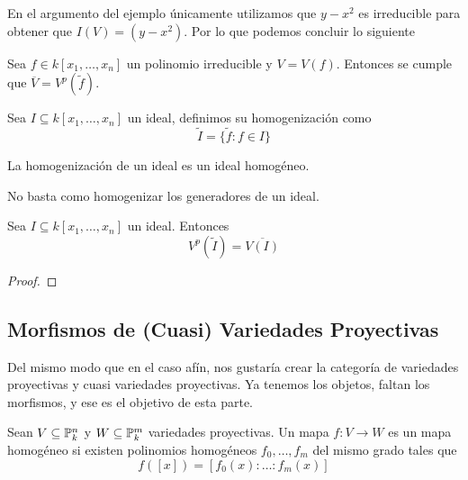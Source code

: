 \documentclass[11pt]{article}
\begin{document}
\vspace{1mm}
\obs En el argumento del ejemplo únicamente utilizamos que $y-x^{2}$ es irreducible para obtener 
que $I(V)=(y-x^{2})$. Por lo que podemos concluir lo siguiente

\begin{cor}
    Sea $f\in k[x_{1},\dots,x_{n}]$ un polinomio irreducible y $V=V(f)$. Entonces se cumple que
    $\overline{V}=V^{p}(\widetilde{f})$.
\end{cor}

\begin{dfn}
    Sea $I\subseteq k[x_{1},\dots,x_{n}]$ un ideal, definimos su homogenización como
    \begin{equation*}
        \widetilde{I}=\{\widetilde{f}:f\in I\}
    \end{equation*}
\end{dfn}

\newpage

\obs La homogenización de un ideal es un ideal homogéneo.

\begin{ejm}
    No basta como homogenizar los generadores de un ideal. %
\end{ejm}

\begin{teo}
    Sea $I\subseteq k[x_{1},\dots,x_{n}]$ un ideal. Entonces
    \begin{equation*}
        V^{p}(\widetilde{I})=\overline{V(I)}
    \end{equation*}
\end{teo}

\begin{proof}
\end{proof}

\newpage

\subsection{Morfismos de (Cuasi) Variedades Proyectivas}

\noindent Del mismo modo que en el caso afín, nos gustaría crear la categoría de variedades 
proyectivas y cuasi variedades proyectivas. Ya tenemos los objetos, faltan los morfismos, y ese es 
el objetivo de esta parte.

\begin{dfn}
    Sean $V\subseteq\P_{k}^{n}$ y $W\subseteq\P_{k}^{m}$ variedades proyectivas. Un mapa 
    $f:V\to W$ es un mapa homogéneo si existen polinomios homogéneos $f_{0},\dots,f_{m}$ del mismo
    grado tales que
    \begin{equation*}
        f([x])=[f_{0}(x):\dots:f_{m}(x)]
    \end{equation*}
\end{dfn}
\end{document}
